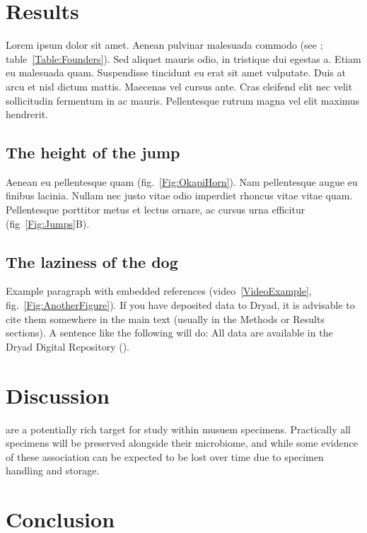\documentclass[11pt]{article}
\begin{document}
	\section*{Results}
	
	Lorem ipsum dolor sit amet. Aenean pulvinar malesuada commodo (see \citealt{DavisEtAl2011}; table~\ref{Table:Founders}). Sed aliquet mauris odio, in tristique dui egestas a. Etiam eu malesuada quam. Suspendisse tincidunt eu erat sit amet vulputate. Duis at arcu et nisl dictum mattis. Maecenas vel cursus ante. Cras eleifend elit nec velit sollicitudin fermentum in ac mauris. Pellentesque rutrum magna vel elit maximus hendrerit. 
	
	\subsection*{The height of the jump}
	
	Aenean eu pellentesque quam (fig.~\ref{Fig:OkapiHorn}). Nam pellentesque augue eu finibus lacinia. Nullam nec justo vitae odio imperdiet rhoncus vitae vitae quam. Pellentesque porttitor metus et lectus ornare, ac cursus urna efficitur (fig~\ref{Fig:Jumps}B). 
	
	\subsection*{The laziness of the dog}
	
	Example paragraph with embedded references (video~\ref{VideoExample}, fig.~\ref{Fig:AnotherFigure}). 
	If you have deposited data to Dryad, it is advisable to cite them somewhere in the main text (usually in the Methods or Results sections). A sentence like the following will do: All data are available in the Dryad Digital Repository (\citealt{CookEtAl2015}).
	
	\section*{Discussion}
	
are a potentially rich target for study within musuem specimens\citep{}. Practically all specimens will be preserved alongside their microbiome, and while some evidence of these association can be expected to be lost over time due to specimen handling and storage. 

	
	\section*{Conclusion}
	
\end{document}
